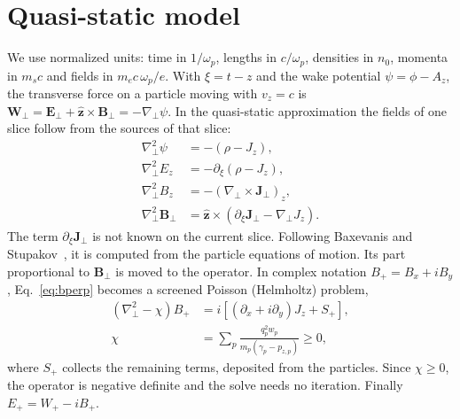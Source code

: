 \documentclass[aps,prab,reprint,floatfix,superscriptaddress,amsmath,amssymb]{revtex4-2}
\begin{document}
\section{Quasi-static model}\label{sec:model}

We use normalized units: time in $1/\omega_p$, lengths in $c/\omega_p$, densities in $n_0$, momenta in $m_s c$ and fields in $m_e c\,\omega_p/e$. With $\xi = t - z$ and the wake potential $\psi = \phi - A_z$, the transverse force on a particle moving with $v_z = c$ is $\bm{W}_\perp = \bm{E}_\perp + \hat{\bm z}\times\bm{B}_\perp = -\nabla_\perp\psi$. In the quasi-static approximation the fields of one slice follow from the sources of that slice:
\begin{align}
\nabla_\perp^2 \psi &= -(\rho - J_z), \label{eq:psi}\\
\nabla_\perp^2 E_z &= -\partial_\xi(\rho - J_z), \label{eq:ez}\\
\nabla_\perp^2 B_z &= -(\nabla_\perp\times\bm{J}_\perp)_z, \label{eq:bz}\\
\nabla_\perp^2 \bm{B}_\perp &= \hat{\bm z}\times\left(\partial_\xi \bm{J}_\perp - \nabla_\perp J_z\right). \label{eq:bperp}
\end{align}
The term $\partial_\xi\bm{J}_\perp$ is not known on the current slice. Following Baxevanis and Stupakov~\cite{Baxevanis2018}, it is computed from the particle equations of motion. Its part proportional to $\bm{B}_\perp$ is moved to the operator. In complex notation $B_+ = B_x + iB_y$, Eq.~\eqref{eq:bperp} becomes a screened Poisson (Helmholtz) problem,
\begin{align}
\left(\nabla_\perp^2 - \chi\right) B_+ &= i\left[(\partial_x + i\partial_y) J_z + S_+\right], \label{eq:helm}\\
\chi &= \sum_p \frac{q_p^2 w_p}{m_p(\gamma_p - p_{z,p})} \ge 0, \label{eq:chi}
\end{align}
where $S_+$ collects the remaining terms, deposited from the particles. Since $\chi\ge 0$, the operator is negative definite and the solve needs no iteration. Finally $E_+ = W_+ - iB_+$.
\end{document}
